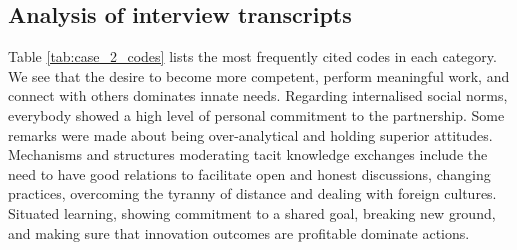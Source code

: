 \subsection{Analysis of interview transcripts}

Table \ref{tab:case_2_codes} lists the most frequently cited codes in each category. We see that the desire to become more competent, perform meaningful work, and connect with others dominates innate needs. Regarding internalised social norms, everybody showed a high level of personal commitment to the partnership. Some remarks were made about being over-analytical and holding superior attitudes. Mechanisms and structures moderating tacit knowledge exchanges include the need to have good relations to facilitate open and honest discussions, changing practices,  overcoming the tyranny of distance and dealing with foreign cultures. Situated learning, showing commitment to a shared goal, breaking new ground, and making sure that innovation outcomes are profitable dominate actions.

